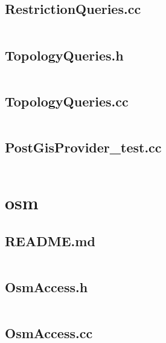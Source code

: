 \documentclass[../main.tex]{subfiles}
\begin{document}
\subsection{RestrictionQueries.cc}\label{lst:mapprovider-postgis-restriction-queries-cc}
\inputminted[linenos=true]{cpp}{parts/code/mapprovider/postgis/RestrictionQueries.cc}

\subsection{TopologyQueries.h}\label{lst:mapprovider-postgis-topology-queries-h}
\inputminted[linenos=true]{cpp}{parts/code/mapprovider/postgis/TopologyQueries.h}

\subsection{TopologyQueries.cc}\label{lst:mapprovider-postgis-topology-queries-cc}
\inputminted[linenos=true]{cpp}{parts/code/mapprovider/postgis/TopologyQueries.cc}

\subsection{PostGisProvider\_test.cc}\label{lst:mapprovider-postgis-postgis-provider-test-cc}
\inputminted[linenos=true]{cpp}{parts/code/mapprovider/postgis/catchtest/PostGisProvider_test.cc}

\section{osm}

\subsection{README.md}\label{lst:osm-readme-md}
\inputminted[breaklines=true]{text}{parts/code/osm/README.md}

\subsection{OsmAccess.h}\label{lst:osm-access-h}
\inputminted[linenos=true]{cpp}{parts/code/osm/OsmAccess.h}

\subsection{OsmAccess.cc}\label{lst:osm-access-cc}
\inputminted[linenos=true]{cpp}{parts/code/osm/OsmAccess.cc}
\end{document}
